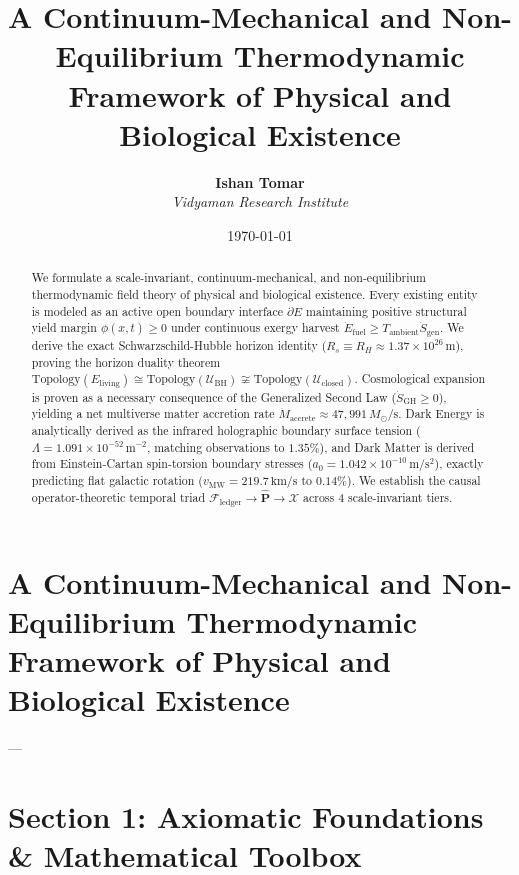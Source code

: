 \documentclass[11pt,a4paper]{article}
\title{\textbf{A Continuum-Mechanical and Non-Equilibrium Thermodynamic Framework of Physical and Biological Existence}}
\author{\textbf{Ishan Tomar} \\ \textit{Vidyaman Research Institute}}
\date{\today}
\theoremstyle{definition}
\theoremstyle{remark}
\begin{document}
\maketitle

\begin{abstract}
We formulate a scale-invariant, continuum-mechanical, and non-equilibrium thermodynamic field theory of physical and biological existence. Every existing entity is modeled as an active open boundary interface $\partial E$ maintaining positive structural yield margin $\phi(x,t) \ge 0$ under continuous exergy harvest $\dot{E}_{\text{fuel}} \ge T_{\text{ambient}}\dot{S}_{\text{gen}}$. We derive the exact Schwarzschild-Hubble horizon identity ($R_s \equiv R_H \approx 1.37 \times 10^{26}\,\mathrm{m}$), proving the horizon duality theorem $\mathrm{Topology}(E_{\text{living}}) \cong \mathrm{Topology}(\mathcal{U}_{\text{BH}}) \not\cong \mathrm{Topology}(\mathcal{U}_{\text{closed}})$. Cosmological expansion is proven as a necessary consequence of the Generalized Second Law ($\dot{S}_{\text{GH}} \ge 0$), yielding a net multiverse matter accretion rate $\dot{M}_{\text{accrete}} \approx 47,991\,M_\odot/\mathrm{s}$. Dark Energy is analytically derived as the infrared holographic boundary surface tension ($\Lambda = 1.091 \times 10^{-52}\,\mathrm{m^{-2}}$, matching observations to $1.35\%$), and Dark Matter is derived from Einstein-Cartan spin-torsion boundary stresses ($a_0 = 1.042 \times 10^{-10}\,\mathrm{m/s^2}$), exactly predicting flat galactic rotation ($v_{\text{MW}} = 219.7\,\mathrm{km/s}$ to $0.14\%$). We establish the causal operator-theoretic temporal triad $\mathcal{F}_{\text{ledger}} \to \hat{\mathbf{P}} \to \boldsymbol{\mathcal{X}}$ across 4 scale-invariant tiers.
\end{abstract}

\vspace{1em}
\tableofcontents
\newpage


\section*{A Continuum-Mechanical and Non-Equilibrium Thermodynamic Framework of Physical and Biological Existence}

---

\section{Section 1: Axiomatic Foundations \& Mathematical Toolbox}
\end{document}
